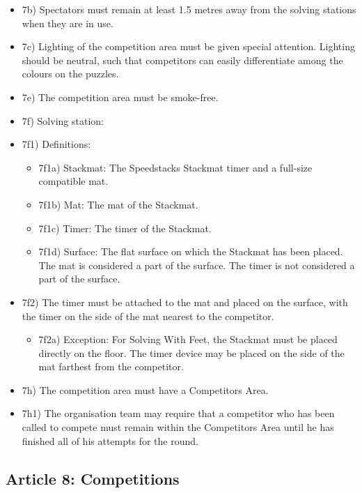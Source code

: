 \begin{itemize}
\item
  7b) Spectators must remain at least 1.5 metres away from the solving
  stations when they are in use.
\item
  7c) Lighting of the competition area must be given special attention.
  Lighting should be neutral, such that competitors can easily
  differentiate among the colours on the puzzles.
\item
  7e) The competition area must be smoke-free.
\item
  7f) Solving station:
\item
  7f1) Definitions:

  \begin{itemize}
  \item
    7f1a) Stackmat: The Speedstacks Stackmat timer and a full-size
    compatible mat.
  \item
    7f1b) Mat: The mat of the Stackmat.
  \item
    7f1c) Timer: The timer of the Stackmat.
  \item
    7f1d) Surface: The flat surface on which the Stackmat has been
    placed. The mat is considered a part of the surface. The timer is
    not considered a part of the surface.
  \end{itemize}
\item
  7f2) The timer must be attached to the mat and placed on the surface,
  with the timer on the side of the mat nearest to the competitor.

  \begin{itemize}
  \item
    7f2a) Exception: For Solving With Feet, the Stackmat must be placed
    directly on the floor. The timer device may be placed on the side of
    the mat farthest from the competitor.
  \end{itemize}
\item
  7h) The competition area must have a Competitors Area.
\item
  7h1) The organisation team may require that a competitor who has been
  called to compete must remain within the Competitors Area until he has
  finished all of his attempts for the round.
\end{itemize}

\subsection{ Article 8: Competitions}


